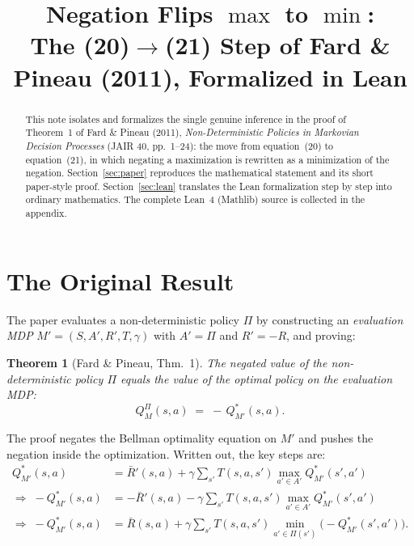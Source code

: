 \documentclass[11pt]{article}
\title{Negation Flips \texorpdfstring{$\max$}{max} to \texorpdfstring{$\min$}{min}:\\
  The (20)$\to$(21) Step of Fard \& Pineau (2011), Formalized in Lean}
\author{}
\date{}
\newtheorem{theorem}{Theorem}
\begin{document}
\maketitle

\begin{abstract}
This note isolates and formalizes the single genuine inference in the proof of
Theorem~1 of Fard \& Pineau (2011), \emph{Non-Deterministic Policies in Markovian
Decision Processes} (JAIR 40, pp.~1--24): the move from equation~(20) to
equation~(21), in which negating a maximization is rewritten as a minimization
of the negation. Section~\ref{sec:paper} reproduces the mathematical statement
and its short paper-style proof. Section~\ref{sec:lean} translates the Lean
formalization step by step into ordinary mathematics. The complete Lean~4
(Mathlib) source is collected in the appendix.
\end{abstract}

\section{The Original Result}
\label{sec:paper}

The paper evaluates a non-deterministic policy $\Pi$ by constructing an
\emph{evaluation MDP} $M' = (S, A', R', T, \gamma)$ with $A' = \Pi$ and
$R' = -R$, and proving:

\begin{theorem}[Fard \& Pineau, Thm.~1]
The negated value of the non-deterministic policy $\Pi$ equals the value of the
optimal policy on the evaluation MDP:
\[
  Q^{\Pi}_M(s,a) \;=\; -\,Q^{*}_{M'}(s,a).
\]
\end{theorem}

The proof negates the Bellman optimality equation on $M'$ and pushes the
negation inside the optimization. Written out, the key steps are:
\begin{align}
  Q^{*}_{M'}(s,a)
    &= \bar R'(s,a) + \gamma \sum_{s'} T(s,a,s') \max_{a' \in A'} Q^{*}_{M'}(s',a')
      \tag{19}\\[2pt]
  \Rightarrow\; -Q^{*}_{M'}(s,a)
    &= -\bar R'(s,a) - \gamma \sum_{s'} T(s,a,s') \max_{a' \in A'} Q^{*}_{M'}(s',a')
      \tag{20}\\[2pt]
  \Rightarrow\; -Q^{*}_{M'}(s,a)
    &= \bar R(s,a) + \gamma \sum_{s'} T(s,a,s') \min_{a' \in \Pi(s')}\!\bigl(-Q^{*}_{M'}(s',a')\bigr).
      \tag{21}
\end{align}
\end{document}
